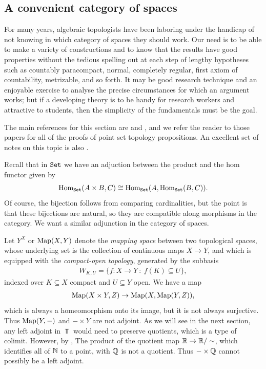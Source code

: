 \documentclass{article}[11pt]
\begin{document}
\subsection{A convenient category of spaces}

\epigraph{For many years, algebraic topologists have been laboring under the handicap of not knowing in which category of spaces they should work. Our need is to be able to make a variety of constructions and to know that the results have good properties without the tedious spelling out at each step of lengthy hypotheses such as countably paracompact, normal, completely regular, first axiom of countability, metrizable, and so forth. It may be good research technique and an enjoyable exercise to analyse the precise circumstances for which an argument works; but if a developing theory is to be handy for research workers and attractive to students, then the simplicity of the fundamentals must be the goal.}{\cite{Steenrod-convenient-cat}}

The main references for this section are \cite{Steenrod-convenient-cat} and \cite{Strickland-cgwh}, and we refer the reader to those papers for all of the proofs of point set topology propositions. An excellent set of notes on this topic is also \cite{martincgwh}.

Recall that in $\texttt{Set}$ we have an adjuction between the product and the hom functor given by 
$$\textup{Hom}_{\texttt{Set}}(A\times B, C)\cong \textup{Hom}_{\texttt{Set}} (A, \textup{Hom}_{\texttt{Set}}(B,C)).$$ Of course, the bijection follows from comparing cardinalities, but the point is that these bijections are natural, so they are compatible along morphisms in the category. We want a similar adjunction in the category of spaces. 

Let $Y^X$ or $\textup{Map}(X,Y)$ denote the \textit{mapping space} between two topological spaces, whose underlying set is the collection of continuous maps $X\to Y$, and which is equipped with the \textit{compact-open topology}, generated by the subbasis
\begin{align*}
	W_{K,U} = \{ f: X \to Y \ : \ f(K)\subseteq U\},
\end{align*}
indexed over $K\subseteq X$ compact and $U\subseteq Y$ open. We have a map
\begin{align}\label{eqn:mapping-space-adjunction}
	\textup{Map}(X\times Y, Z) \to \textup{Map} (X, \textup{Map}(Y,Z)),
\end{align}
which is always a homeomorphism onto its image, but it is not always surjective. Thus $\textup{Map}(Y,-)$ and $-\times Y$ are not adjoint. As we will see in the next section, any left adjoint in $\Top$ would need to preserve quotients, which is a type of colimit. However, by \cite[Section 22, Example 7]{munkres}, The product of the quotient map  $\mathbb{R}\to \mathbb{R}/\sim$, which identifies all of $\mathbb{N}$ to a point, with $\mathbb{Q}$ is not a quotient. Thus $- \times \mathbb{Q}$ cannot possibly be a left adjoint.
\end{document}
